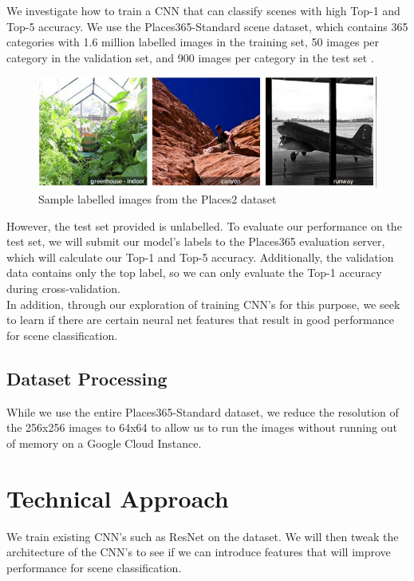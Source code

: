\documentclass[10pt,twocolumn,letterpaper]{article}
\begin{document}
We investigate how to train a CNN that can classify scenes with high Top-1
and Top-5 accuracy. We use the Places365-Standard scene dataset, which contains
365 categories with 1.6 million labelled images in the training set, 50 images
per category in the validation set, and 900 images per category in the test set
\cite{Zhou}.\\

\begin{figure}[h]
\begin{center}
  \includegraphics[width=0.8\linewidth]{places2db-cropped.png}
\end{center}
   \caption{Sample labelled images from the Places2 dataset}
\label{figure:sample-images}
\end{figure}


However, the test set provided is unlabelled. To evaluate our performance on
the test set, we will submit our model's labels to the Places365 evaluation
server, which will calculate our Top-1 and Top-5 accuracy. Additionally, the
validation data contains only the top label, so we can only evaluate the Top-1
accuracy during cross-validation.\\

In addition, through our exploration of training CNN's for this purpose, we
seek to learn if there are certain neural net features that result in good
performance for scene classification.\\

\subsection{Dataset Processing}
While we use the entire Places365-Standard dataset, we reduce the resolution of
the 256x256 images to 64x64 to allow us to run the images without running out of
memory on a Google Cloud Instance.\\

\section{Technical Approach}
We train existing CNN's such as ResNet\cite{ResNet} on the
dataset. We will then tweak the architecture of the CNN's to see if we can
introduce features that will improve performance for scene classification. \\
\end{document}
